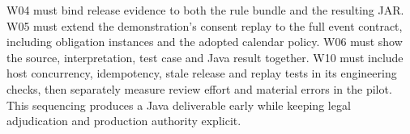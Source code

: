 W04 must bind release evidence to both the rule bundle and the resulting JAR.
W05 must extend the demonstration's consent replay to the full event contract,
including obligation instances and the adopted calendar policy. W06 must show
the source, interpretation, test case and Java result together. W10 must include
host concurrency, idempotency, stale release and replay tests in its engineering
checks, then separately measure review effort and material errors in the pilot.
This sequencing produces a Java deliverable early while keeping legal
adjudication and production authority explicit.
